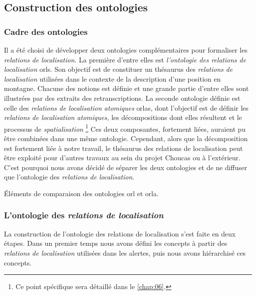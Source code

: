 \subsection{Construction des ontologies}

\subsubsection{Cadre des ontologies}

Il a été choisi de développer deux ontologies complémentaires pour
formaliser les \emph{relations de localisation.} La première d'entre
elles est \emph{l'ontologie des relations de localisation}
\acp{orl}. Son objectif est de constituer un thésaurus des
\emph{relations de localisation} utilisées dans le contexte de la
description d'une position en montagne. Chacune des notions est
définie et une grande partie d'entre elles sont illustrées par des
extraits des retranscriptions. La seconde ontologie définie est celle
des \emph{relations de localisation atomiques} \acp{orla}, dont
l'objectif est de définir les \emph{relations de localisation
  atomiques,} les décompositions dont elles résultent et le processus
de \emph{spatialisation} \footnote{Ce point spécifique sera détaillé
  dans le \autoref{chap:06}.} Ces deux composantes, fortement liées,
auraient pu être combinées dans une même ontologie. Cependant, alors
que la décomposition est fortement liée à notre travail, le thésaurus
des relations de localisation peut être exploité pour d'autres travaux
au sein du projet Choucas ou à l'extérieur. C'est pourquoi nous avons
décidé de séparer les deux ontologies et de ne diffuser que
l'ontologie des \emph{relations de localisation.}

\begin{table}
  \centering
  
  \caption{Éléments de comparaison des ontologies \ac{orl} et
    \ac{orla}.}
  \label{tab:orl_vs_orla}
\end{table}

\subsubsection{L'ontologie des \emph{relations de localisation}}

La construction de l'ontologie des relations de localisation s'est
faite en deux étapes. Dans un premier temps nous avons défini les
concepts à partir des \emph{relations de localisation} utilisées dans
les alertes, puis nous avons hiérarchisé ces concepts.

